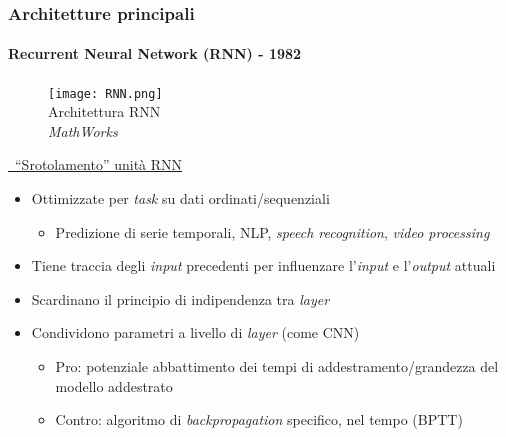 \begin{frame}[t] \frametitle{Architetture principali}
\framesubtitle{Recurrent Neural Network (RNN) - 1982}
{\scriptsize
{}
	\begin{minipage}[t]{\textwidth}
		\begin{figure}
		    \centering
		    \texttt{[image: RNN.png]}
            {\tiny\\Architettura RNN\\\textit{\textcopyright MathWorks}}
	    \end{figure}
        \begin{center}
            \vspace*{-.3cm}
            \href{https://cdn-images-1.medium.com/max/800/1*b4w12Ekzp_Vf6l0ntA0zWw.gif}{\faExternalLinkSquare\ ``Srotolamento'' unità RNN}
        \end{center}
    \end{minipage}
	\begin{minipage}[t]{\textwidth}
        \vspace*{.3cm}
		\begin{itemize}[leftmargin=10pt,align=right]
			\item[\alert{\faArrowCircleRight}] Ottimizzate per \emph{task} su dati ordinati/sequenziali
 		    \begin{itemize}[leftmargin=10pt,align=right] 
			    \item[\alert{\faArrowCircleRight}] Predizione di serie temporali, NLP, \emph{speech recognition}, \emph{video processing}
            \end{itemize}             
			\item[\alert{\faArrowCircleRight}] Tiene traccia degli \emph{input} precedenti per influenzare l'\emph{input} e l'\emph{output} attuali
			\onslide<3->
			\item[\alert{\faArrowCircleRight}] Scardinano il principio di indipendenza tra \emph{layer}
			\onslide<4->
			\item[\alert{\faArrowCircleRight}] Condividono parametri a livello di \emph{layer} (come CNN)
			\begin{itemize}[leftmargin=10pt,align=right]
				\onslide<5->\item[\alert{\faArrowCircleRight}] \alert{Pro:} potenziale abbattimento dei tempi di addestramento/grandezza del modello addestrato
				\onslide<6->\item[\alert{\faArrowCircleRight}] \alert{Contro:} algoritmo di \emph{backpropagation} specifico, nel tempo (BPTT)

\end{itemize}
\end{itemize}
\end{minipage}}
\end{frame}
